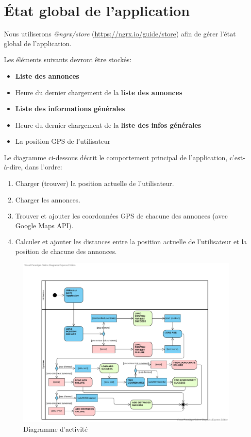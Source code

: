 \documentclass[french]{report}
\begin{document}
\section{État global de l'application}
Nous utiliserons \textit{@ngrx/store} (\url{https://ngrx.io/guide/store}) afin de 
gérer l'état global de l'application.

Les éléments suivants devront être stockés:
\begin{itemize}
    \item \textbf{Liste des annonces}
    \item Heure du dernier chargement de la \textbf{liste des annonces}
    \item \textbf{Liste des informations générales}
    \item Heure du dernier chargement de la \textbf{liste des infos générales}
    \item La position GPS de l'utilisateur
\end{itemize}
\vspace{1em}

Le diagramme ci-dessous décrit le comportement principal de l'application, c'est-à-dire,
dans l'ordre:
\begin{enumerate}
    \item Charger (trouver) la position actuelle de l'utilisateur.
    \item Charger les annonces.
    \item Trouver et ajouter les coordonnées GPS de chacune des annonces (avec Google Maps API).
    \item Calculer et ajouter les distances entre la position actuelle de l'utilisateur et la position de chacune des annonces.
\end{enumerate}

\begin{figure}[H]
    \centering
    \includegraphics[width=\textwidth]{../diags/serado_activity.pdf}
    \caption{Diagramme d'activité}
    \label{fig:activity_diagram}
\end{figure}
\end{document}
